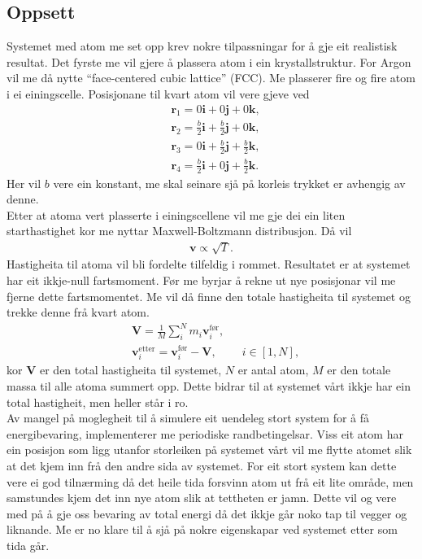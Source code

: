 \documentclass[12pt, a4paper]{article}
\theoremstyle{definition}
\newcommand{\vb}{\mathbf}
\begin{document}
    \subsection*{Oppsett}
        Systemet med atom me set opp krev nokre tilpassningar for å gje eit realistisk resultat. Det fyrste me vil gjere å plassera atom i ein krystallstruktur. For Argon
        vil me då nytte ``face-centered cubic lattice'' (FCC). Me plasserer fire og fire atom i ei einingscelle. Posisjonane til kvart atom vil vere gjeve ved
        \begin{align*}
            &\vb{r}_1 = 0\vb{i} + 0\vb{j} + 0\vb{k}, \\
            &\vb{r}_2 = \frac{b}{2}\vb{i} + \frac{b}{2}\vb{j} + 0\vb{k}, \\
            &\vb{r}_3 = 0\vb{i} + \frac{b}{2}\vb{j} + \frac{b}{2}\vb{k}, \\
            &\vb{r}_4 = \frac{b}{2}\vb{i} + 0\vb{j} + \frac{b}{2}\vb{k}.
        \end{align*}
        Her vil $b$ vere ein konstant, me skal seinare sjå på korleis trykket er avhengig av denne. \\ %

        Etter at atoma vert plasserte i einingscellene vil me gje dei ein liten starthastighet kor me nyttar Maxwell-Boltzmann distribusjon. Då vil
        \begin{align*}
            \vb{v} \propto \sqrt{T}.
        \end{align*}
        Hastigheita til atoma vil bli fordelte tilfeldig i rommet. Resultatet er at systemet har eit ikkje-null fartsmoment. Før me byrjar å rekne ut nye posisjonar vil
        me fjerne dette fartsmomentet. Me vil då finne den totale hastigheita til systemet og trekke denne frå kvart atom.
        \begin{align*}
            &\vb{V} = \frac{1}{M}\sum_i^N m_i\vb{v}_{i}^{\text{før}}, \\
            &\vb{v}_{i}^{\text{etter}} = \vb{v}_{i}^{\text{før}} - \vb{V}, \qquad \ i \in [1, N],
        \end{align*}
        kor $\vb{V}$ er den total hastigheita til systemet, $N$ er antal atom, $M$ er den totale massa til alle atoma summert opp. Dette bidrar til at systemet vårt
        ikkje har ein total hastigheit, men heller står i ro. \\
        Av mangel på moglegheit til å simulere eit uendeleg stort system for å få energibevaring, implementerer me periodiske randbetingelsar. Viss eit atom har ein 
        posisjon som ligg utanfor storleiken på systemet vårt vil me flytte atomet slik at det kjem inn frå den andre sida av systemet. For eit stort system kan dette 
        vere ei god tilnærming då det heile tida forsvinn atom ut frå eit lite område, men samstundes kjem det inn nye atom slik at tettheten er jamn. Dette vil og vere med
        på å gje oss bevaring av total energi då det ikkje går noko tap til vegger og liknande. Me er no klare til å sjå på nokre eigenskapar ved systemet etter som tida går.
\end{document}

